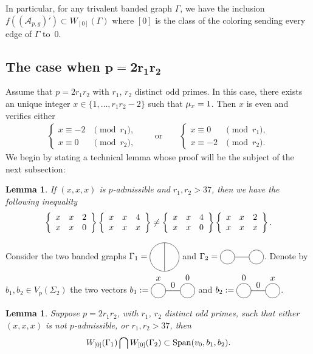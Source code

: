 \documentclass[11pt]{article}
\numberwithin{equation}{section}
\newtheorem{Lemma}[Theorem]{Lemma}
\begin{document}
In particular, for any trivalent banded graph $\Gamma$, we have the inclusion $ f ( (\mathcal{A}_{p,g})' ) \subset W_{[0]}(\Gamma)$ where $[0]$ is the class of the coloring sending every edge of $\Gamma$ to~$0$.

\setcounter{section}{4}
\setcounter{subsection}{1}
\setcounter{subsubsection}{0}
\setcounter{Theorem}{2}
\setcounter{equation}{1}
\subsection[The case when $p=2r_1r_2$]{The case when $\boldsymbol{p=2r_1r_2}$}

Assume that $p=2r_1r_2$ with $r_1$, $r_2$ distinct odd primes. In this case, there exists an unique integer $x\in \{ 1, \ldots, r_1r_2-2\}$ such that $\mu_{x}=1$. Then $x$ is even and verifies either
\begin{gather*}\begin{cases}
x\equiv -2 &\pmod{r_1}, \\
x\equiv 0 & \pmod{r_2},
\end{cases} \qquad \text{or}\qquad \begin{cases}
x\equiv 0 &\pmod{r_1}, \\
x\equiv -2 & \pmod{r_2}.
\end{cases}\end{gather*}
We begin by stating a technical lemma whose proof will be the subject of the next subsection:
\begin{Lemma}\label{GA}
 If $(x,x,x)$ is $p$-admissible and $r_1,r_2>37$, then we have the following inequality
\begin{gather*} \left\{ \begin{array}{ccc} x & x & 2 \\ x & x & 0 \end{array} \right\} \left\{ \begin{array}{ccc} x & x & 4 \\ x & x & x \end{array} \right\} \neq \left\{ \begin{array}{ccc} x & x & 4 \\ x & x & 0 \end{array} \right\}\left\{ \begin{array}{ccc} x & x & 2 \\ x & x & x \end{array} \right\}.\end{gather*}
\end{Lemma}

 Consider the two banded graphs $\Gamma_1= \Thetagraph$ and $\Gamma_2=\Eyesgraph$. Denote by $b_1, b_2 \in V_p(\Sigma_2)$ the two vectors $b_1:= \eyesgraph{$x$}{0}{0}$ and $b_2 := \eyesgraph{0}{0}{$x$}$.

\begin{Lemma}\label{lemma_2r1r2}
Suppose $p=2r_1r_2$, with $r_1$, $r_2$ distinct odd primes, such that either $(x,x,x)$ is not $p$-admissible, or $r_1,r_2>37$, then
\begin{gather*} W_{[0]}(\Gamma_1) \bigcap W_{[0]}(\Gamma_2) \subset \operatorname{Span} ( v_0, b_1, b_2 ).\end{gather*}
\end{Lemma}
\end{document}
